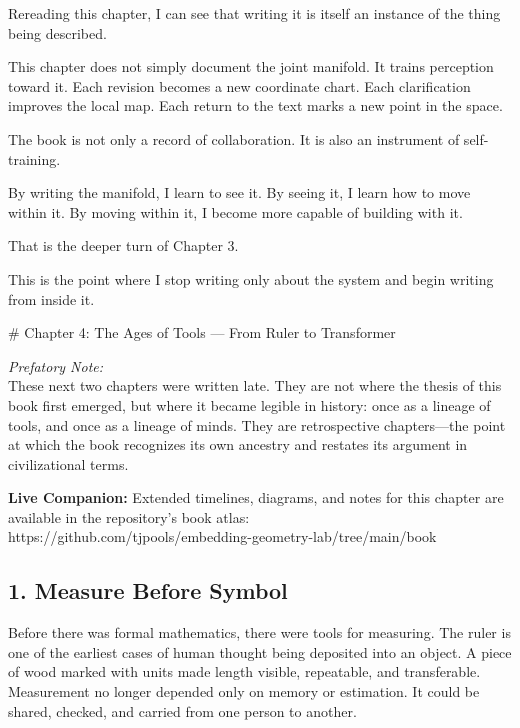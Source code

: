 \documentclass[
]{article}
\begin{document}
Rereading this chapter, I can see that writing it is itself an instance
of the thing being described.

This chapter does not simply document the joint manifold. It trains
perception toward it. Each revision becomes a new coordinate chart. Each
clarification improves the local map. Each return to the text marks a
new point in the space.

The book is not only a record of collaboration. It is also an instrument
of self-training.

By writing the manifold, I learn to see it. By seeing it, I learn how to
move within it. By moving within it, I become more capable of building
with it.

That is the deeper turn of Chapter 3.

This is the point where I stop writing only about the system and begin
writing from inside it.

\newpage
\vspace*{3cm}
\begin{center}
# Chapter 4: The Ages of Tools — From Ruler to Transformer
\end{center}

\emph{Prefatory Note:}\\
These next two chapters were written late. They are not where the thesis
of this book first emerged, but where it became legible in history: once
as a lineage of tools, and once as a lineage of minds. They are
retrospective chapters---the point at which the book recognizes its own
ancestry and restates its argument in civilizational terms.

\textbf{Live Companion:} Extended timelines, diagrams, and notes for
this chapter are available in the repository's book atlas:\\
https://github.com/tjpools/embedding-geometry-lab/tree/main/book

\hypertarget{measure-before-symbol}{%
\subsection{1. Measure Before Symbol}\label{measure-before-symbol}}

Before there was formal mathematics, there were tools for measuring. The
ruler is one of the earliest cases of human thought being deposited into
an object. A piece of wood marked with units made length visible,
repeatable, and transferable. Measurement no longer depended only on
memory or estimation. It could be shared, checked, and carried from one
person to another.
\end{document}
